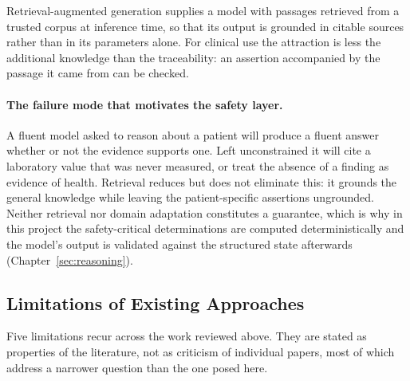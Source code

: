 Retrieval-augmented generation \cite{lewis2020rag} supplies a model with passages retrieved
from a trusted corpus at inference time, so that its output is grounded in citable sources
rather than in its parameters alone. For clinical use the attraction is less the additional
knowledge than the traceability: an assertion accompanied by the passage it came from can be
checked.

\paragraph{The failure mode that motivates the safety layer.} A fluent model asked to reason
about a patient will produce a fluent answer whether or not the evidence supports one. Left
unconstrained it will cite a laboratory value that was never measured, or treat the absence
of a finding as evidence of health. Retrieval reduces but does not eliminate this: it
grounds the general knowledge while leaving the patient-specific assertions ungrounded.
Neither retrieval nor domain adaptation constitutes a guarantee, which is why in this
project the safety-critical determinations are computed deterministically and the model's
output is validated against the structured state afterwards
(Chapter~\ref{sec:reasoning}).

\subsection{Limitations of Existing Approaches}
\label{subsec:sota-limits}

Five limitations recur across the work reviewed above. They are stated as properties of the
literature, not as criticism of individual papers, most of which address a narrower question
than the one posed here.


